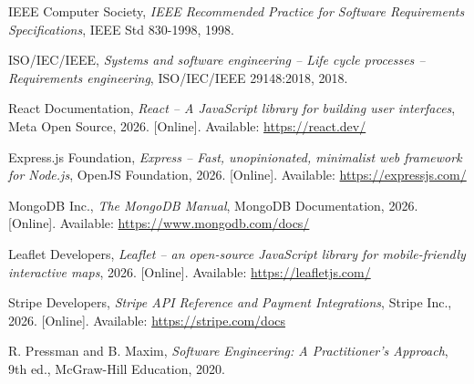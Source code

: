 \documentclass[12pt,a4paper]{article}
\begin{document}
\begin{enumerate}[label={[\arabic*]}]
    \item IEEE Computer Society, \textit{IEEE Recommended Practice for Software Requirements Specifications}, IEEE Std 830-1998, 1998.
    \item ISO/IEC/IEEE, \textit{Systems and software engineering -- Life cycle processes -- Requirements engineering}, ISO/IEC/IEEE 29148:2018, 2018.
    \item React Documentation, \textit{React -- A JavaScript library for building user interfaces}, Meta Open Source, 2026. [Online]. Available: \url{https://react.dev/}
    \item Express.js Foundation, \textit{Express -- Fast, unopinionated, minimalist web framework for Node.js}, OpenJS Foundation, 2026. [Online]. Available: \url{https://expressjs.com/}
    \item MongoDB Inc., \textit{The MongoDB Manual}, MongoDB Documentation, 2026. [Online]. Available: \url{https://www.mongodb.com/docs/}
    \item Leaflet Developers, \textit{Leaflet -- an open-source JavaScript library for mobile-friendly interactive maps}, 2026. [Online]. Available: \url{https://leafletjs.com/}
    \item Stripe Developers, \textit{Stripe API Reference and Payment Integrations}, Stripe Inc., 2026. [Online]. Available: \url{https://stripe.com/docs}
    \item R. Pressman and B. Maxim, \textit{Software Engineering: A Practitioner's Approach}, 9th ed., McGraw-Hill Education, 2020.
\end{enumerate}
\end{document}
